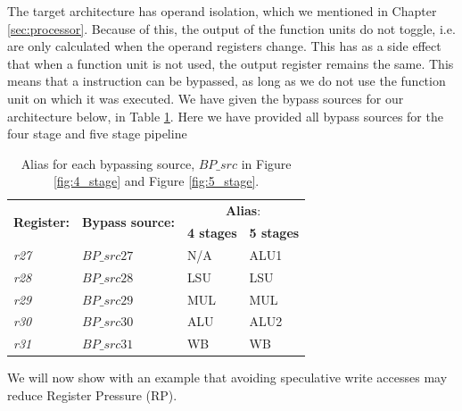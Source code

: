 
The target architecture has operand isolation, which we mentioned in Chapter \ref{sec:processor}. Because of this, the output of the function units do not toggle, i.e. are only calculated when the operand registers change. This has as a side effect that when a function unit is not used, the output register remains the same. This means that a instruction can be bypassed, as long as we do not use the function unit on which it was executed. We have given the bypass sources for our architecture below, in Table \ref{table:bypass_alias}. Here we have provided all bypass sources for the four stage and five stage pipeline

\begin{table}[H]
\caption{Alias for each bypassing source, $BP\_src$ in Figure \ref{fig:4_stage} and Figure \ref{fig:5_stage}.}
\begin{center}
\begin{tabular}{@{}llll@{}}
\toprule
\multirow{2}{*}{\textbf{Register:}} & \multirow{2}{*}{\textbf{Bypass source:}} & \multicolumn{2}{c}{\textbf{Alias}:} \\ \cline{3-4}
 & & \textbf{4 stages} & \textbf{5 stages} \\
\hline
\emph{r27} & $BP\_src27$ & N/A & ALU1 \\ 
\emph{r28} & $BP\_src28$ & LSU & LSU \\
\emph{r29} & $BP\_src29$ & MUL & MUL \\ 
\emph{r30} & $BP\_src30$ & ALU & ALU2 \\
\emph{r31} & $BP\_src31$ & WB & WB \\
\bottomrule
\end{tabular}
\end{center}
\label{table:bypass_alias}
\end{table}%


We will now show with an example that avoiding speculative write accesses may reduce Register Pressure (RP).


